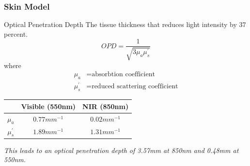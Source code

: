 \documentclass{beamer}
\begin{document}
\begin{frame}
\frametitle{Skin Model}
\begin{block}{Optical Penetration Depth}
The tissue thickness that reduces light intensity by 37 percent.
\begin{equation}
OPD = \frac{1}{\sqrt{3\mu_a\mu^\prime_s}}
\end{equation}
where
\begin{equation}
\begin{split}
\mu_a &= \text{absorbtion coefficient} \\
\mu^\prime_s &= \text{reduced scattering coefficient}
\end{split}
\end{equation}
\begin{center}
\begin{tabular}{c|cc}
& Visible (550nm) & NIR (850nm) \\
\hline
$\mu_a$ & $0.77mm^{-1}$ & $0.02mm^{-1}$ \\
$\mu^\prime_s$ & $1.89mm^{-1}$ & $1.31mm^{-1}$
\end{tabular}
\end{center}
\emph{This leads to an optical penetration depth of 3.57mm at 850nm and 0.48mm at 550nm.}
\end{block}
\end{frame}
\end{document}
